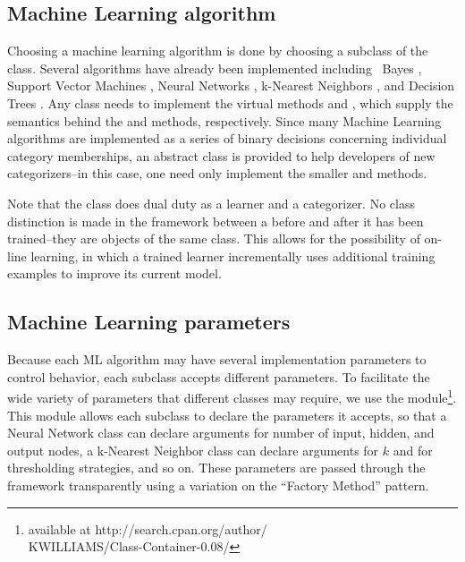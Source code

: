 \begin{singlespace}
\subsection*{Machine Learning algorithm}
Choosing a machine learning algorithm is done
by choosing a subclass of the  class.  Several
algorithms have already been implemented including \naive\ Bayes
\cite{lewis:98}, Support Vector Machines \cite{scholkopf:99}
\cite{cortes:95}, Neural Networks \cite{calvo:01} \cite{yang:99},
k-Nearest Neighbors \cite{yang:99}, and Decision Trees
\cite{quinlan:89}.  Any  class needs to implement the
virtual methods  and ,
which supply the semantics behind the  and
 methods, respectively.  Since many Machine
Learning algorithms are implemented as a series of binary decisions
concerning individual category memberships, an abstract
 class is provided to help developers of new
categorizers--in this case, one need only implement the smaller
 and 
methods.

Note that the  class does dual duty as a learner and a
categorizer.  No class distinction is made in the framework between a
 before and after it has been trained--they are
objects of the same class.  This allows for the possibility of on-line
learning, in which a trained learner incrementally uses additional
training examples to improve its current model.

\subsection*{Machine Learning parameters}
Because each ML algorithm may have several implementation parameters
to control behavior, each  subclass accepts different
parameters.  To facilitate the wide variety of parameters that
different classes may require, we use the 
module\footnote{available at http://search.cpan.org/author/\\
KWILLIAMS/Class-Container-0.08/}.  This module allows each
 subclass to declare the parameters it accepts, so
that a Neural Network class can declare arguments for number of input,
hidden, and output nodes, a k-Nearest Neighbor class can declare
arguments for $k$ and for thresholding strategies, and so on.  These
parameters are passed through the framework transparently using a
variation on the ``Factory Method'' pattern. \cite{gamma:95}


\end{singlespace}
